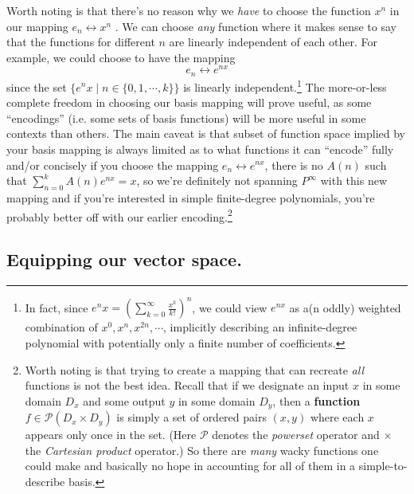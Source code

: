 \documentclass[letterpaper,12pt]{report}
\begin{document}
Worth noting is that there's no reason why we \emph{have} to choose the function \(x^n\)
in our mapping
\(e_n \leftrightarrow x^n\)
. We can choose \emph{any} function where it makes sense to say
that the functions for different \(n\) are linearly independent of each other.
For example, we could choose to have the mapping
\[e_n \leftrightarrow e^{nx}\]
since the set 
\(\{e^nx \mid n \in \{0, 1, \cdots, k\}\}\)
is linearly independent.\footnote
{
  In fact, since \(e^nx = \left(\sum_{k=0}^{\infty}\frac{x^k}{k!}\right)^n\), we could view
  \(e^{nx}\) as a(n oddly) weighted combination of \(x^0, x^n, x^{2n}, \cdots\),
  implicitly describing an infinite-degree polynomial with potentially only a finite
  number of coefficients.
}
The more-or-less complete freedom in choosing our basis mapping will prove useful,
as some ``encodings'' (i.e. some sets of basis functions)
will be more useful in some contexts than others.
The main caveat is that subset of function space implied by your basis mapping
is always limited as to what functions it can
``encode'' fully and/or concisely 
\textemdash{} if you choose the mapping \(e_n \leftrightarrow e^{nx}\),
there is no \(A(n)\) such that \(\sum_{n=0}^{k}A(n)e^{nx} = x \), so we're definitely not
spanning \(P^\infty\) with this new mapping and if you're interested
in simple finite-degree polynomials, you're probably better off
with our earlier encoding.\footnote
{
  Worth noting is that trying to create a mapping that can recreate \emph{all}
  functions is not the best idea.
  Recall that if we designate an input \(x\) in some domain \(D_x\)
  and some output \(y\) in some domain \(D_y\),
  then a \textbf{function} \(f \in \mathcal{P}(D_x \times D_y)\)
  is simply a set of ordered pairs \((x,y)\)
  where each \(x\) appears only once in the set.
  (Here \(\mathcal{P}\) denotes the \emph{powerset} operator
  and \(\times\) the \emph{Cartesian product} operator.)
  So there are \emph{many} wacky functions one could make and basically no
  hope in accounting for all of them in a simple-to-describe basis.
}

\subsection{Equipping our vector space.}
\end{document}
